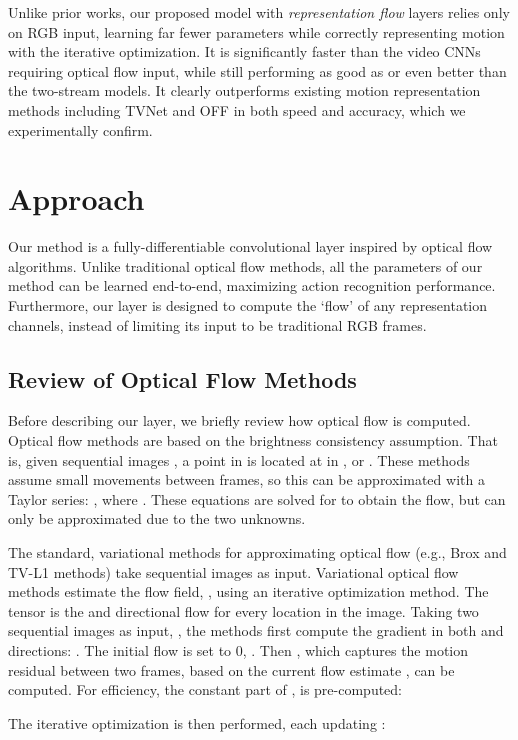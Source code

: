 \documentclass[10pt,twocolumn,letterpaper]{article}
\begin{document}
Unlike prior works, our proposed model with \emph{representation flow} layers relies only on RGB input, learning far fewer parameters while correctly representing motion with the iterative optimization. It is significantly faster than the video CNNs requiring optical flow input, while still performing as good as or even better than the two-stream models. It clearly outperforms existing motion representation methods including TVNet \cite{fan2018end} and OFF \cite{sun2018optical} in both speed and accuracy, which we experimentally confirm.

\section{Approach}
Our method is a fully-differentiable convolutional layer inspired by optical flow algorithms. Unlike traditional optical flow methods, all the parameters of our method can be learned end-to-end, maximizing action recognition performance. Furthermore, our layer is designed to compute the `flow' of any representation channels, instead of limiting its input to be traditional RGB frames.

\subsection{Review of Optical Flow Methods}
Before describing our layer, we briefly review how optical flow is computed. Optical flow methods are based on the brightness consistency assumption. That is, given sequential images , a point  in  is located at  in , or . These methods assume small movements between frames, so this can be approximated with a Taylor series: , where . These equations are solved for  to obtain the flow, but can only be approximated due to the two unknowns.

The standard, variational methods for approximating optical flow (e.g., Brox \cite{brox2004high} and TV-L1 \cite{zach2007duality} methods) take sequential images  as input. Variational optical flow methods estimate the flow field, , using an iterative optimization method. The tensor  is the  and  directional flow for every location in the image. Taking two sequential images as input, , the methods first compute the gradient in both  and  directions: . The initial flow is set to 0, . Then , which captures the motion residual between two frames, based on the current flow estimate , can be computed. For efficiency, the constant part of ,  is pre-computed:


The iterative optimization is then performed, each updating :
\end{document}
